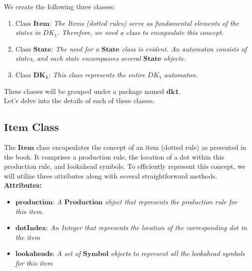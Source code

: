 We create the following three classes:
\begin{enumerate}
    \item Class \(\boldsymbol{Item}\): \textit{The Items (dotted rules) serve as fundamental elements of the states in \( DK_{1} \). Therefore, we need a class to encapsulate this concept.}
    \item Class \(\boldsymbol{State}\): \textit{The need for a \(\boldsymbol{State}\) class is evident. An automaton consists of states, and each state encompasses several \(\boldsymbol{State}\) objects.}
    \item Class \(\boldsymbol{DK_{1}}\): \textit{This class represents the entire \( DK_{1} \) automaton.}
\end{enumerate}

These classes will be grouped under a package named \(\boldsymbol{dk1}\).\\

Let’s delve into the details of each of these classes.

\subsection{\(\boldsymbol{Item}\) Class}

The \(\boldsymbol{Item}\) class encapsulates the concept of an item (dotted rule) as presented in the book. It comprises a production rule, the location of a dot within this production rule, and lookahead symbols. To efficiently represent this concept, we will utilize three attributes along with several straightforward methods.\\

\textbf{Attributes:}
\begin{itemize}
    \item \(\boldsymbol{production}\): \textit{A \(\boldsymbol{Production}\) object that represents the production rule for this item.}
    \item \(\boldsymbol{dotIndex}\): \textit{An Integer that represents the location of the corresponding dot in the item}
    \item \(\boldsymbol{lookaheads}\): \textit{A set of \(\boldsymbol{Symbol}\) objects to represent all the lookahead symbols for this item}
\end{itemize}

